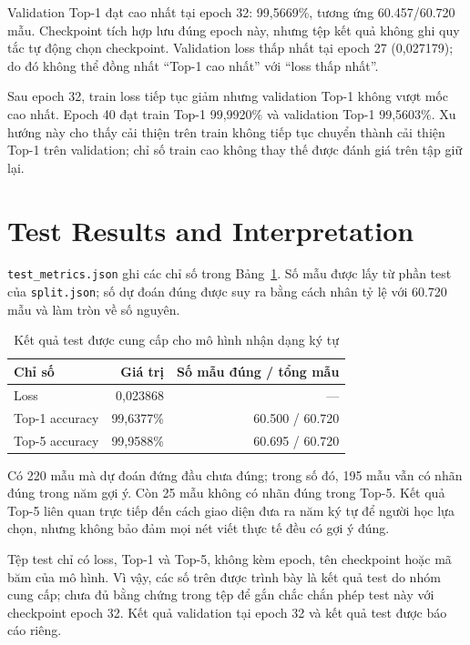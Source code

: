 Validation Top-1 đạt cao nhất tại epoch 32: 99,5669\%, tương ứng 60.457/60.720 mẫu. Checkpoint tích hợp lưu đúng epoch này, nhưng tệp kết quả không ghi quy tắc tự động chọn checkpoint. Validation loss thấp nhất tại epoch 27 (0,027179); do đó không thể đồng nhất ``Top-1 cao nhất'' với ``loss thấp nhất''.

Sau epoch 32, train loss tiếp tục giảm nhưng validation Top-1 không vượt mốc cao nhất. Epoch 40 đạt train Top-1 99,9920\% và validation Top-1 99,5603\%. Xu hướng này cho thấy cải thiện trên train không tiếp tục chuyển thành cải thiện Top-1 trên validation; chỉ số train cao không thay thế được đánh giá trên tập giữ lại.

\clearpage
\section{Test Results and Interpretation}

\texttt{test\_metrics.json} ghi các chỉ số trong Bảng~\ref{tab:handwriting-test-results}. Số mẫu được lấy từ phần test của \texttt{split.json}; số dự đoán đúng được suy ra bằng cách nhân tỷ lệ với 60.720 mẫu và làm tròn về số nguyên.

\begin{table}[htbp]
\centering
\caption{Kết quả test được cung cấp cho mô hình nhận dạng ký tự}
\label{tab:handwriting-test-results}
\begin{tabular}{@{}lrr@{}}
\toprule
\textbf{Chỉ số} & \textbf{Giá trị} & \textbf{Số mẫu đúng / tổng mẫu} \\
\midrule
Loss & 0,023868 & --- \\
Top-1 accuracy & 99,6377\% & 60.500 / 60.720 \\
Top-5 accuracy & 99,9588\% & 60.695 / 60.720 \\
\bottomrule
\end{tabular}
\end{table}

Có 220 mẫu mà dự đoán đứng đầu chưa đúng; trong số đó, 195 mẫu vẫn có nhãn đúng trong năm gợi ý. Còn 25 mẫu không có nhãn đúng trong Top-5. Kết quả Top-5 liên quan trực tiếp đến cách giao diện đưa ra năm ký tự để người học lựa chọn, nhưng không bảo đảm mọi nét viết thực tế đều có gợi ý đúng.

Tệp test chỉ có loss, Top-1 và Top-5, không kèm epoch, tên checkpoint hoặc mã băm của mô hình. Vì vậy, các số trên được trình bày là kết quả test do nhóm cung cấp; chưa đủ bằng chứng trong tệp để gắn chắc chắn phép test này với checkpoint epoch 32. Kết quả validation tại epoch 32 và kết quả test được báo cáo riêng.

